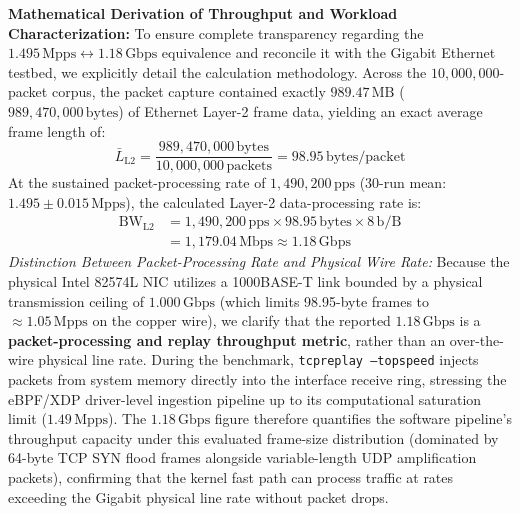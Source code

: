 \documentclass{ieeeaccess}
\renewcommand{\_}{\textunderscore\allowbreak}
\begin{document}
\textbf{Mathematical Derivation of Throughput and Workload Characterization:}
To ensure complete transparency regarding the $1.495\,\text{Mpps} \leftrightarrow 1.18\,\text{Gbps}$ equivalence and reconcile it with the Gigabit Ethernet testbed, we explicitly detail the calculation methodology. Across the $10{,}000{,}000$-packet corpus, the packet capture contained exactly $989.47\,\text{MB}$ ($989{,}470{,}000\,\text{bytes}$) of Ethernet Layer-2 frame data, yielding an exact average frame length of:
\begin{equation}
  \bar{L}_{\text{L2}} = \frac{989{,}470{,}000\,\text{bytes}}{10{,}000{,}000\,\text{packets}} = 98.95\,\text{bytes/packet}
  \label{eq:avg_frame_size}
\end{equation}
At the sustained packet-processing rate of $1{,}490{,}200\,\text{pps}$ (30-run mean: $1.495 \pm 0.015\,\text{Mpps}$), the calculated Layer-2 data-processing rate is:
\begin{align}
  \text{BW}_{\text{L2}} &= 1{,}490{,}200\,\text{pps} \times 98.95\,\text{bytes} \times 8\,\text{b/B} \nonumber \\
  &= 1{,}179.04\,\text{Mbps} \approx 1.18\,\text{Gbps}
  \label{eq:l2_throughput}
\end{align}
\textit{Distinction Between Packet-Processing Rate and Physical Wire Rate:}
Because the physical Intel 82574L NIC utilizes a 1000BASE-T link bounded by a physical transmission ceiling of $1.000\,\text{Gbps}$ (which limits 98.95-byte frames to $\approx\!1.05\,\text{Mpps}$ on the copper wire), we clarify that the reported $1.18\,\text{Gbps}$ is a \textbf{packet-processing and replay throughput metric}, rather than an over-the-wire physical line rate. During the benchmark, \texttt{tcpreplay --topspeed} injects packets from system memory directly into the interface receive ring, stressing the eBPF/XDP driver-level ingestion pipeline up to its computational saturation limit ($1.49\,\text{Mpps}$). The $1.18\,\text{Gbps}$ figure therefore quantifies the software pipeline's throughput capacity under this evaluated frame-size distribution (dominated by 64-byte TCP SYN flood frames alongside variable-length UDP amplification packets), confirming that the kernel fast path can process traffic at rates exceeding the Gigabit physical line rate without packet drops.
\end{document}
